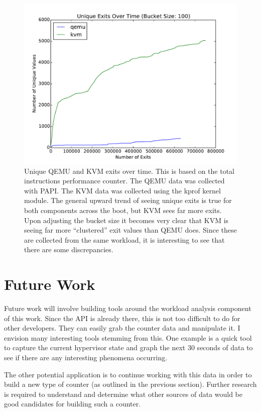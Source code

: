\documentclass[notitlepage]{article}
\begin{document}
\begin{figure}[htpb!]
\centering
\includegraphics[width=1\textwidth]{qemu_kvm_overtime.pdf}
\caption{Unique QEMU and KVM exits over time. This is based on the total
instructions performance counter. The QEMU data was collected with PAPI. The KVM
data was collected using the kprof kernel module. The general upward trend of
seeing unique exits is true for both components across the boot, but KVM sees
far more exits. Upon adjusting the bucket size it becomes very clear that KVM
is seeing far more ``clustered'' exit values than QEMU does. Since these are
collected from the same workload, it is interesting to see that there are some
discrepancies.}
\label{fig:qemukvm}
\end{figure}


\section{Future Work}
\label{sec:futurework}
Future work will involve building tools around the workload analysis component
of this work. Since the API is already there, this is not too difficult to do
for other developers. They can easily grab the counter data and manipulate it. I
envision many interesting tools stemming from this. One example is a quick tool
to capture the current hypervisor state and graph the next 30 seconds of data to
see if there are any interesting phenomena occurring.

The other potential application is to continue working with this data in order
to build a new type of counter (as outlined in the previous section). Further
research is required to understand and determine what other sources of data
would be good candidates for building such a counter.
\end{document}
